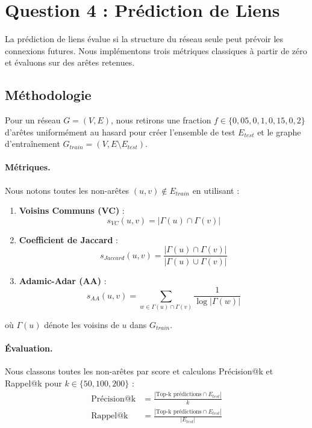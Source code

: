 \documentclass[12pt,a4paper]{article}
\begin{document}
\section{Question 4 : Prédiction de Liens}

La prédiction de liens évalue si la structure du réseau seule peut prévoir les connexions futures. Nous implémentons trois métriques classiques à partir de zéro et évaluons sur des arêtes retenues.

\subsection{Méthodologie}

Pour un réseau $G=(V,E)$, nous retirons une fraction $f \in \{0,05, 0,1, 0,15, 0,2\}$ d'arêtes uniformément au hasard pour créer l'ensemble de test $E_{test}$ et le graphe d'entraînement $G_{train}=(V, E \setminus E_{test})$.

\paragraph{Métriques.} Nous notons toutes les non-arêtes $(u,v) \notin E_{train}$ en utilisant :

\begin{enumerate}
    \item \textbf{Voisins Communs (VC)} : 
    \begin{equation}
    s_{VC}(u,v) = |\Gamma(u) \cap \Gamma(v)|
    \end{equation}
    
    \item \textbf{Coefficient de Jaccard} :
    \begin{equation}
    s_{Jaccard}(u,v) = \frac{|\Gamma(u) \cap \Gamma(v)|}{|\Gamma(u) \cup \Gamma(v)|}
    \end{equation}
    
    \item \textbf{Adamic-Adar (AA)} :
    \begin{equation}
    s_{AA}(u,v) = \sum_{w \in \Gamma(u) \cap \Gamma(v)} \frac{1}{\log |\Gamma(w)|}
    \end{equation}
\end{enumerate}

où $\Gamma(u)$ dénote les voisins de $u$ dans $G_{train}$.

\paragraph{Évaluation.} Nous classons toutes les non-arêtes par score et calculons Précision@k et Rappel@k pour $k \in \{50, 100, 200\}$ :
\begin{align}
\text{Précision@k} &= \frac{|\text{Top-k prédictions} \cap E_{test}|}{k} \\
\text{Rappel@k} &= \frac{|\text{Top-k prédictions} \cap E_{test}|}{|E_{test}|}
\end{align}
\end{document}
